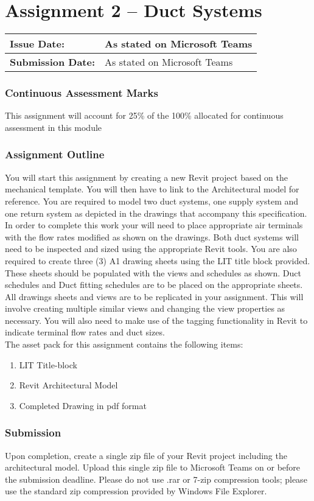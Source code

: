 
	
\part*{Assignment 2 – Duct Systems}

\begin{tabularx}{\textwidth}{ |X|X| }
	\hline
	\textbf{Issue Date:} & As stated on Microsoft Teams \\
	\hline 
	\textbf{Submission Date:}  & As stated on Microsoft Teams  \\
	\hline
\end{tabularx}


\section*{Continuous Assessment Marks}
This assignment will account for 25\% of the 100\% allocated for continuous assessment in this module

\section*{Assignment Outline}
You will start this assignment by creating a new Revit project based on the mechanical template.  You will then have to link to the Architectural model for reference.  You are required to model two duct systems, one supply system and one return system as depicted in the drawings that accompany this specification. In order to complete this work your will need to place appropriate air terminals with the flow rates modified as shown on the drawings. Both duct systems will need to be inspected and sized using the appropriate Revit tools. You are also required to create three (3) A1 drawing sheets using the LIT title block provided. These sheets should be populated with the views and schedules as shown.  Duct schedules and Duct fitting schedules are to be placed on the appropriate sheets. All drawings sheets and views are to be replicated in your assignment. This will involve creating multiple similar views and changing the view properties as necessary. You will also need to make use of the tagging functionality in Revit to indicate terminal flow rates and duct sizes.\\


The asset pack for this assignment contains the following items:
\begin{enumerate}
	\item LIT Title-block
	\item Revit Architectural Model
	\item Completed Drawing in pdf format
\end{enumerate}


\section*{Submission}
Upon completion, create a single zip file of your Revit project including the architectural model. Upload this single zip file to Microsoft Teams on or before the submission deadline.  Please do not use .rar or 7-zip compression tools; please use the standard zip compression provided by Windows File Explorer.

